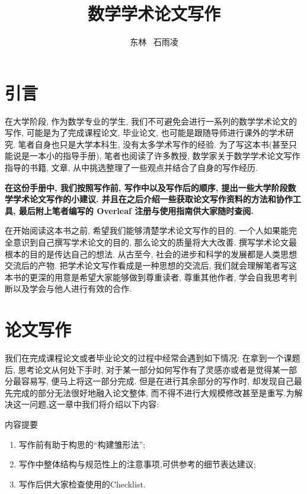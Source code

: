 \documentclass{booki}
\begin{document}
\title{数学学术论文写作}
\author{东林 \ 石雨凌}
\maketitlepage
\tableofcontents
\setlength{\parskip}{1em}
\newpage
\chapter{引言}
在大学阶段, 作为数学专业的学生, 我们不可避免会进行一系列的数学学术论文的写作, 可能是为了完成课程论文, 毕业论文, 也可能是跟随导师进行课外的学术研究. 笔者自身也只是大学本科生, 没有太多学术写作的经验. 为了写这本书(甚至只能说是一本小的指导手册), 笔者也阅读了许多教授, 数学家关于数学学术论文写作指导的书籍, 文章, 从中挑选整理了一些观点并结合了自身的写作经历.

{\textbf{在这份手册中, 我们按照写作前, 写作中以及写作后的顺序, 提出一些大学阶段数学学术论文写作的小建议. 并且在之后介绍一些获取论文写作资料的方法和协作工具, 最后附上笔者编写的 Overleaf 注册与使用指南供大家随时查阅.}}

\par 在开始阅读这本书之前, 希望我们能够清楚学术论文写作的目的. 一个人如果能完全意识到自己撰写学术论文的目的, 那么论文的质量将大大改善. 撰写学术论文最根本的目的是传达自己的想法. 从古至今, 社会的进步和科学的发展都是人类思想交流后的产物. 把学术论文写作看成是一种思想的交流后, 我们就会理解笔者写这本书的更深的用意是希望大家能够做到尊重读者, 尊重其他作者, 学会自我思考判断以及学会与他人进行有效的合作.

\chapter{论文写作}
我们在完成课程论文或者毕业论文的过程中经常会遇到如下情况: 在拿到一个课题后, 思考论文从何处下手时, 对于某一部分如何写作有了灵感亦或者是觉得某一部分最容易写, 便马上将这一部分完成. 但是在进行其余部分的写作时, 却发现自己最先完成的部分无法很好地融入论文整体, 而不得不进行大规模修改甚至是重写.为解决这一问题,这一章中我们将介绍以下内容: 

\begin{titledBox}{内容提要}
\begin{enumerate}
            \item 写作前有助于构思的``构建雏形法”;
            \item 写作中整体结构与规范性上的注意事项,可供参考的细节表达建议;
            \item 写作后供大家检查使用的Checklist.
        \end{enumerate}
\end{titledBox}
\end{document}
